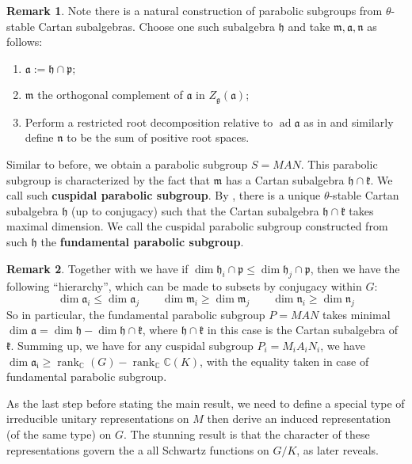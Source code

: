 \documentclass[11pt]{report}
\theoremstyle{definition}
\newtheorem{Rmk}{Remark}[chapter]
\theoremstyle{plain}
\DeclareMathOperator{\ad}{ad}
\DeclareMathOperator{\rk}{rank}
\newcommand{\complex}{\mathbb{C}}
\newcommand{\Lie}[1]{\mathfrak{#1}}
\begin{document}
\begin{Rmk}\label{cuspidal parabolic}
	Note there is a natural construction of parabolic subgroups from $\theta$-stable Cartan subalgebras. Choose one such subalgebra $\Lie{h}$ and take $\Lie{m,a,n}$ as follows:
	\begin{enumerate}
		\item $\Lie{a}:=\Lie{h}\cap \Lie{p}$;
		\item $\Lie{m}$ the orthogonal complement of $\Lie{a}$ in $Z_{\Lie{g}}(\Lie{a})$;
		\item Perform a restricted root decomposition relative to $\ad \Lie{a}$ as in  and similarly define $\Lie{n}$ to be the sum of positive root spaces. 
	\end{enumerate} 
Similar to before, we obtain a parabolic subgroup $S=MAN$. This parabolic subgroup is characterized by the fact that $\Lie{m}$ has a Cartan subalgebra $\Lie{h}\cap \Lie{k}$. We call such \textbf{cuspidal parabolic subgroup}. By \cite[Theorem~5.22(b)]{knapp2016}, there is a unique $\theta$-stable Cartan subalgebra $\Lie{h}$ (up to conjugacy) such that the Cartan subalgebra $\Lie{h\cap k}$ takes maximal dimension. We call the cuspidal parabolic subgroup constructed from such $\Lie{h}$ the \textbf{fundamental parabolic subgroup}.
\end{Rmk}
\begin{Rmk}\label{hierachy of parabolic subgroup}
	Together with  we have if $\dim\Lie{h}_i\cap \Lie{p}\leq \dim\Lie{h}_j\cap \Lie{p}$, then we have the following ``hierarchy'', which can be made to subsets by conjugacy within $G$:
	\begin{equation}
	\dim \Lie{a}_i\leq \dim \Lie{a}_j \qquad \dim \Lie{m}_i\geq \dim \Lie{m}_j \qquad \dim \Lie{n}_i\geq \dim \Lie{n}_j
	\end{equation}
	So in particular, the fundamental parabolic subgroup $P=MAN$ takes minimal $\dim \Lie{a}=\dim\Lie{h}-\dim \Lie{h\cap k}$, where $\Lie{h\cap k}$ in this case is the Cartan subalgebra of $\Lie{k}$. Summing up, we have for any cuspidal subgroup $P_i=M_iA_iN_i$, we have $\dim \Lie{a_i}\geq \rk_\complex(G)-\rk_\complex\complex(K)$, with the equality taken in case of fundamental parabolic subgroup.
\end{Rmk}
As the last step before stating the main result, we need to define a special type of irreducible unitary representations on $M$ then derive an induced representation (of the same type) on $G$. The stunning result is that the character of these representations govern the a all Schwartz functions on $G/K$, as  later reveals.
\end{document}
